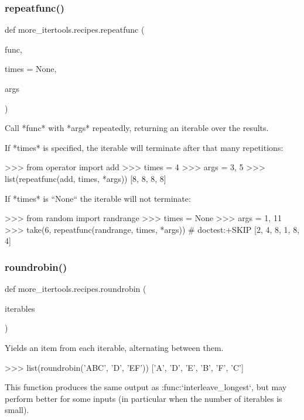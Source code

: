 \subsubsection{\texorpdfstring{repeatfunc()}{repeatfunc()}}
{\footnotesize\ttfamily def more\+\_\+itertools.\+recipes.\+repeatfunc (\begin{DoxyParamCaption}\item[{}]{func,  }\item[{}]{times = {\ttfamily None},  }\item[{}]{args }\end{DoxyParamCaption})}

\begin{DoxyVerb}Call *func* with *args* repeatedly, returning an iterable over the
results.

If *times* is specified, the iterable will terminate after that many
repetitions:

    >>> from operator import add
    >>> times = 4
    >>> args = 3, 5
    >>> list(repeatfunc(add, times, *args))
    [8, 8, 8, 8]

If *times* is ``None`` the iterable will not terminate:

    >>> from random import randrange
    >>> times = None
    >>> args = 1, 11
    >>> take(6, repeatfunc(randrange, times, *args))  # doctest:+SKIP
    [2, 4, 8, 1, 8, 4]\end{DoxyVerb}
 \mbox{\label{namespacemore__itertools_1_1recipes_ae11f688fd6dc665c014e396ff41b03cf}} 
\subsubsection{\texorpdfstring{roundrobin()}{roundrobin()}}
{\footnotesize\ttfamily def more\+\_\+itertools.\+recipes.\+roundrobin (\begin{DoxyParamCaption}\item[{}]{iterables }\end{DoxyParamCaption})}

\begin{DoxyVerb}Yields an item from each iterable, alternating between them.

    >>> list(roundrobin('ABC', 'D', 'EF'))
    ['A', 'D', 'E', 'B', 'F', 'C']

This function produces the same output as :func:`interleave_longest`, but
may perform better for some inputs (in particular when the number of
iterables is small).\end{DoxyVerb}
 \mbox{\label{namespacemore__itertools_1_1recipes_ab26d4a14071109df8e8b32a01cc529bd}} 
